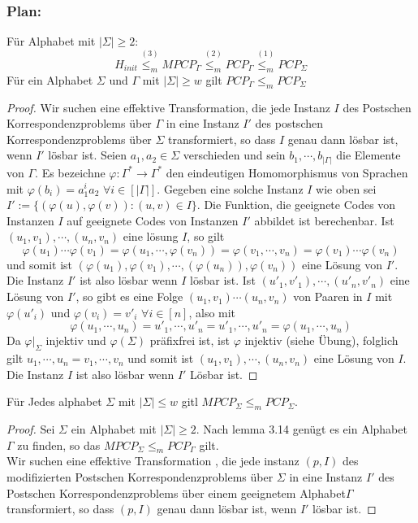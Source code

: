   \subsubsection*{Plan: } Für Alphabet mit $|\Sigma| \geq 2$: \[H_{init} \stackrel{(3)}{\leq_m} MPCP_{\Gamma} \stackrel{(2)}{\leq_m} PCP_{\Gamma} \stackrel{(1)}{\leq_m} PCP_{\Sigma}\]
   Für ein Alphabet $\Sigma$ und $\Gamma$ mit $|\Sigma| \geq w$ gilt $PCP_{\Gamma} \leq_m PCP_{\Sigma}$
  \begin{proof}
    Wir suchen eine effektive Transformation, die jede Instanz $I$ des Postschen Korrespondenzproblems über $\Gamma$ in eine Instanz $I'$ des postschen Korrespondenzproblems über $\Sigma$ transformiert, so dass $I$ genau dann lösbar ist, wenn $I'$ lösbar ist. Seien $a_1, a_2 \in \Sigma$ verschieden und sein $b_1, \cdots, b_{|\Gamma|}$ die Elemente von $\Gamma$. Es bezeichne $\varphi : \Gamma^* \to \Gamma^*$ den eindeutigen Homomorphismus von Sprachen mit $\varphi (b_i) = a^i_1 a_2$ $\forall i \in [|\Gamma|]$. Gegeben eine solche Instanz $I$ wie oben sei $I' := \{(\varphi(u), \varphi(v)) : (u, v) \in I\}$. Die Funktion, die geeignete Codes von Instanzen $I$ auf geeignete Codes von Instanzen $I'$ abbildet ist berechenbar. Ist $(u_1, v_1), \cdots, (u_n, v_n)$ eine lösung $I$, so gilt \[\varphi(u_1) \cdots \varphi(v_1) = \varphi(u_1, \cdots, \varphi(v_n)) = \varphi(v_1, \cdots, v_n) = \varphi(v_1) \cdots \varphi(v_n)\] und somit ist $(\varphi(u_1), \varphi(v_1), \cdots, (\varphi(u_n)), \varphi(v_n))$ eine Lösung von $I'$. Die Instanz $I'$ ist also lösbar wenn $I$ lösbar ist. Ist $(u'_1, v'_1), \cdots, (u'_n, v'_n)$ eine Lösung von $I'$, so gibt es eine Folge $(u_1, v_1)\cdots (u_n, v_n)$ von Paaren in $I$ mit $\varphi(u'_i)$ und $\varphi(v_i) = v'_i$ $\forall i \in [n]$, also mit \[\varphi(u_1, \cdots, u_n) = u'_1, \cdots, u'_n = u'_1, \cdots, u'_n =\varphi(u_1, \cdots, u_n)\] Da $\varphi \vert_{\Sigma}$ injektiv und $\varphi (\Sigma)$ präfixfrei ist, ist $\varphi$ injektiv (siehe Übung), folglich gilt $u_1, \cdots, u_n = v_1, \cdots, v_n$ und somit ist $(u_1, v_1), \cdots, (u_n, v_n)$ eine Lösung von $I$. Die Instanz $I$ ist also lösbar wenn $I'$ Lösbar ist.
  \end{proof}


   Für Jedes alphabet $\Sigma$ mit $|\Sigma| \leq w$ gitl $MPCP_{\Sigma} \leq_m PCP_{\Sigma}$.
  \begin{proof}
    Sei $\Sigma$ ein Alphabet mit $|\Sigma| \geq 2$. Nach lemma 3.14 genügt es ein Alphabet $\Gamma$ zu finden, so das $MPCP_{\Sigma} \leq_m PCP_{\Gamma}$ gilt. \\Wir suchen eine effektive Transformation , die jede instanz $(p, I)$ des modifizierten Postschen Korrespondenzproblems über $\Sigma$ in eine Instanz $I'$ des Postschen Korrespondenzproblems über einem geeignetem Alphabet$\Gamma$ transformiert, so dass $(p, I)$ genau dann lösbar ist, wenn $I'$ lösbar ist.
  \end{proof}
